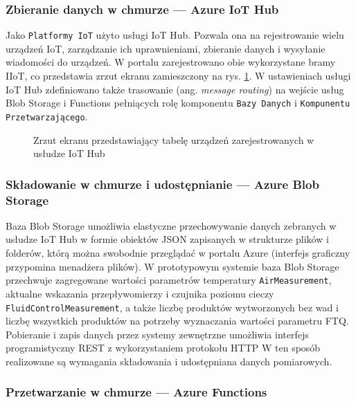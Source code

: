 \documentclass[a4paper, 12pt, twoside]{article}
\begin{document}
\subsubsection{Zbieranie danych w chmurze --- Azure IoT Hub}
Jako \texttt{Platformy IoT} użyto usługi IoT Hub. Pozwala ona na rejestrowanie
wielu urządzeń IoT, zarządzanie ich uprawnieniami, zbieranie danych i wysyłanie
wiadomości do urządzeń. W portalu zarejestrowano obie wykorzystane bramy IIoT, co przedstawia
zrzut ekranu zamieszczony na rys. \ref{fig:iot_hub_1}. W ustawieniach
usługi IoT Hub zdefiniowano także trasowanie (ang. \emph{message routing})
na wejście usług Blob Storage i Functions pełniących rolę komponentu
\texttt{Bazy Danych} i \texttt{Kompunentu Przetwarzającego}.

\begin{figure}[h]
      \centering
      \caption{Zrzut ekranu przedstawiający tabelę urządzeń zarejestrowanych w usłudze IoT Hub}
      \label{fig:iot_hub_1}
\end{figure}

\subsubsection{Składowanie w chmurze i udostępnianie --- Azure Blob Storage}
Baza Blob Storage umożliwia elastyczne przechowywanie danych zebranych w
usłudze IoT Hub w formie obiektów JSON zapisanych w strukturze plików i folderów,
którą można swobodnie przeglądać w portalu Azure (interfejs graficzny przypomina
menadżera plików).
W prototypowym systemie baza Blob Storage przechwuje zagregowane wartości
parametrów temperatury \texttt{AirMeasurement}, aktualne wskazania przepływomierzy
i czujnika poziomu cieczy \texttt{FluidControlMeasurement}, a także liczbę
produktów wytworzonych bez wad i liczbę wszystkich produktów na potrzeby
wyznaczania wartości parametru FTQ. Pobieranie i zapis danych przez systemy
zewnętrzne umożliwia interfejs programistyczny
REST z wykorzystaniem protokołu HTTP \cite{blob-storage-rest}
W ten sposób realizowane są wymagania składowania i udostępniana danych pomiarowych.

\subsubsection{Przetwarzanie w chmurze --- Azure Functions}
\end{document}
